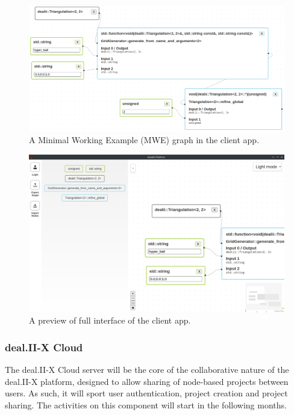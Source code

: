 \documentclass[a4paper,12pt]{article}
\begin{document}
\begin{figure}
  \centering

  \includegraphics[width=\textwidth]{dualistic-mwe.png}

  \caption{A Minimal Working Example (MWE)  graph in the client app.}
  \label{fig:dualistic-architecture}
\end{figure}

\begin{figure}
  \centering

  \includegraphics[width=\textwidth]{dualistic-interface-preview.png}

  \caption{A preview of full interface of the client app.}
  \label{fig:dualistic-interface-preview}
\end{figure}

\subsubsection{deal.II-X Cloud}

The deal.II-X Cloud server will be the core of the collaborative nature of the deal.II-X platform, designed to allow sharing of node-based projects between users.  As such, it will sport user authentication, project creation and project sharing. The activities on this component will start in the following months.
\end{document}

